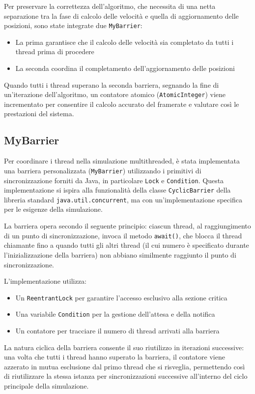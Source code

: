 \documentclass[a4paper,12pt]{report}
\begin{document}
Per preservare la correttezza dell'algoritmo, che necessita di una netta separazione tra la fase di calcolo delle velocità e quella di aggiornamento delle posizioni, sono state integrate due \texttt{MyBarrier}:
\begin{itemize}
    \item La prima garantisce che il calcolo delle velocità sia completato da tutti i thread prima di procedere
    \item La seconda coordina il completamento dell'aggiornamento delle posizioni
\end{itemize}

Quando tutti i thread superano la seconda barriera, segnando la fine di un'iterazione dell'algoritmo, un contatore atomico (\texttt{AtomicInteger}) viene incrementato per consentire il calcolo accurato del framerate e valutare così le prestazioni del sistema.

\subsection{MyBarrier}
Per coordinare i thread nella simulazione multithreaded, è stata implementata una barriera personalizzata (\texttt{MyBarrier}) utilizzando i primitivi di sincronizzazione forniti da Java, in particolare \texttt{Lock} e \texttt{Condition}. Questa implementazione si ispira alla funzionalità della classe \texttt{CyclicBarrier} della libreria standard \texttt{java.util.concurrent}, ma con un'implementazione specifica per le esigenze della simulazione.

La barriera opera secondo il seguente principio: ciascun thread, al raggiungimento di un punto di sincronizzazione, invoca il metodo \texttt{await()}, che blocca il thread chiamante fino a quando tutti gli altri thread (il cui numero è specificato durante l'inizializzazione della barriera) non abbiano similmente raggiunto il punto di sincronizzazione.

L'implementazione utilizza:
\begin{itemize}
    \item Un \texttt{ReentrantLock} per garantire l'accesso esclusivo alla sezione critica
    \item Una variabile \texttt{Condition} per la gestione dell'attesa e della notifica
    \item Un contatore per tracciare il numero di thread arrivati alla barriera
\end{itemize}

La natura ciclica della barriera consente il suo riutilizzo in iterazioni successive: una volta che tutti i thread hanno superato la barriera, il contatore viene azzerato in mutua esclusione dal primo thread che si risveglia, permettendo così di riutilizzare la stessa istanza per sincronizzazioni successive all'interno del ciclo principale della simulazione.
\end{document}
